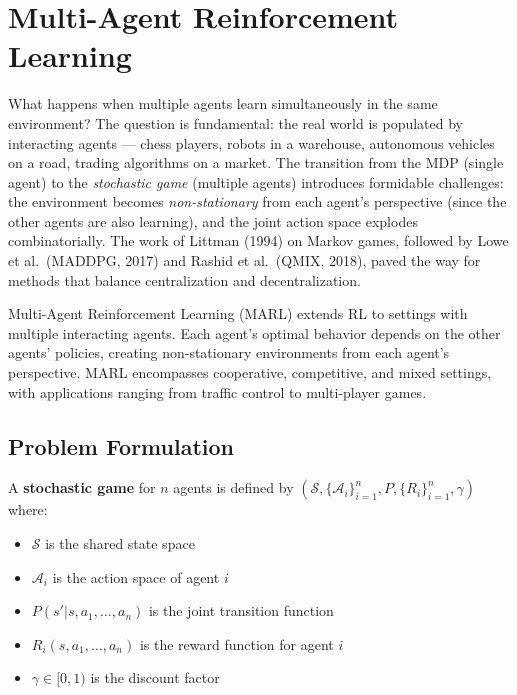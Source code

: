 \chapter{Multi-Agent Reinforcement Learning}
\label{ch:multi_agent}

What happens when multiple agents learn simultaneously in the same environment? The question is fundamental: the real world is populated by interacting agents --- chess players, robots in a warehouse, autonomous vehicles on a road, trading algorithms on a market. The transition from the MDP (single agent) to the \emph{stochastic game} (multiple agents) introduces formidable challenges: the environment becomes \emph{non-stationary} from each agent's perspective (since the other agents are also learning), and the joint action space explodes combinatorially. The work of Littman (1994) on Markov games, followed by Lowe et al.\ (MADDPG, 2017) and Rashid et al.\ (QMIX, 2018), paved the way for methods that balance centralization and decentralization.

\begin{intuition}
Multi-Agent Reinforcement Learning (MARL) extends RL to settings with
multiple interacting agents. Each agent's optimal behavior depends on
the other agents' policies, creating non-stationary environments from
each agent's perspective. MARL encompasses cooperative, competitive,
and mixed settings, with applications ranging from traffic control to
multi-player games.
\end{intuition}

\section{Problem Formulation}
\label{sec:marl:formulation}

\begin{definition}
A \textbf{stochastic game} for $n$ agents is defined by
$(\mathcal{S}, \{\mathcal{A}_i\}_{i=1}^n, P, \{R_i\}_{i=1}^n, \gamma)$ where:
\begin{itemize}
    \item $\mathcal{S}$ is the shared state space
    \item $\mathcal{A}_i$ is the action space of agent $i$
    \item $P(s' | s, a_1, \ldots, a_n)$ is the joint transition function
    \item $R_i(s, a_1, \ldots, a_n)$ is the reward function for agent $i$
    \item $\gamma \in [0,1)$ is the discount factor
\end{itemize}
\end{definition}

